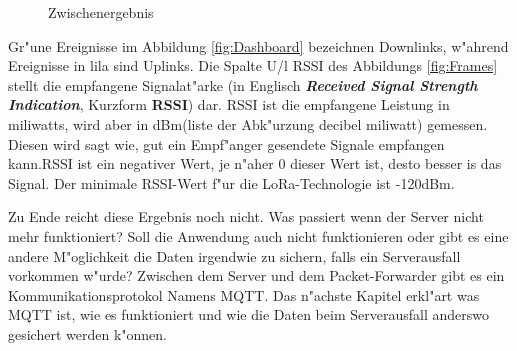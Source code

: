 	\begin{figure}[h!]
	
	\caption{Zwischenergebnis}
\end{figure}
Gr"une Ereignisse im Abbildung \ref{fig:Dashboard} bezeichnen Downlinks, w"ahrend Ereignisse in lila sind Uplinks. Die Spalte U/l RSSI des Abbildungs \ref{fig:Frames} stellt die empfangene Signalat"arke (in Englisch \textbf{\textit{Received Signal Strength Indication}}, Kurzform \textbf{RSSI}) dar. RSSI ist die empfangene Leistung in miliwatts, wird aber in dBm(liste der Abk"urzung decibel miliwatt) gemessen. Diesen wird sagt wie, gut ein Empf"anger gesendete Signale empfangen kann.RSSI ist ein negativer Wert, je n"aher 0 dieser Wert ist, desto besser is das Signal. Der minimale RSSI-Wert f"ur die LoRa-Technologie ist -120dBm.  

\vspace{10cm}

Zu Ende reicht diese Ergebnis noch nicht. Was passiert wenn der Server nicht mehr funktioniert? Soll die Anwendung auch nicht funktionieren oder gibt es eine andere M"oglichkeit die Daten irgendwie zu sichern, falls ein Serverausfall vorkommen w"urde? Zwischen dem Server und dem Packet-Forwarder gibt es ein Kommunikationsprotokol Namens MQTT. Das n"achste Kapitel erkl"art was MQTT ist, wie es funktioniert und wie die Daten beim Serverausfall anderswo gesichert werden k"onnen. 


